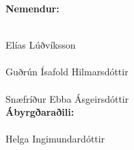 \documentclass[a4paper,12pt,twoside]{article}
\begin{document}
\begin{center}
\textbf{Nemendur:}
\vspace{2cm}

\underline{\hspace{8cm}} \\
Elías Lúðvíksson \\[1.5cm]

\underline{\hspace{8cm}} \\
Guðrún Ísafold Hilmarsdóttir \\[1.5cm]

\underline{\hspace{8cm}} \\
Snæfríður Ebba Ásgeirsdóttir \\[2cm]

\textbf{Ábyrgðaraðili:} \\[1.5cm]
\underline{\hspace{8cm}} \\
Helga Ingimundardóttir

\end{center}
\end{document}
